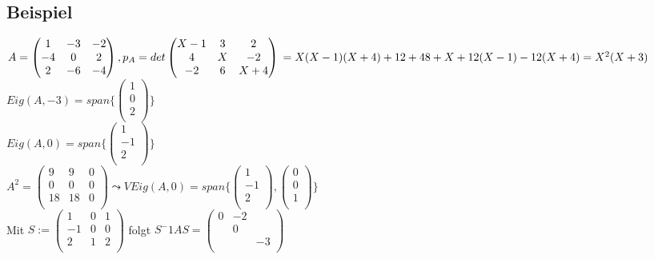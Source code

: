 \documentclass[a4paper, 12pt]{extarticle}
\begin{document}
\subsection*{Beispiel}
$A = \left( \begin{matrix}
	1 & -3 & -2\\
	-4 & 0 & 2\\
	2 & -6 & -4\\
\end{matrix} \right), 
p_A = det\left( \begin{matrix}
	X-1 & 3 & 2\\
	4 & X & -2\\
	-2 & 6 & X+4\\
\end{matrix} \right) \\
= X(X-1)(X+4) + 12 + 48 + X + 12(X-1) - 12(X+4) = X^2(X+3)$\\
$Eig(A,-3) = span\{ \left( \begin{matrix}
	1 \\
	0 \\
	2 \\
\end{matrix}\right)\}$\\
$Eig(A,0) = span\{ \left( \begin{matrix}
	1 \\
	-1 \\
	2 \\
\end{matrix}\right)\}$\\
$A^2 =\left( \begin{matrix}
	9 & 9 & 0 \\
	0 & 0 & 0 \\
	18 & 18 & 0 \\
\end{matrix}\right) \leadsto VEig(A,0) = span\{ 
\left( \begin{matrix}
1 \\
-1 \\
2 \\
\end{matrix} \right) ,
\left( \begin{matrix}
0 \\
0 \\
1 \\
\end{matrix} \right) \}$\\
Mit $S := 
\left( \begin{matrix}
	1 & 0 & 1 \\
	-1 & 0  & 0 \\
	2 & 1 & 2 \\
\end{matrix} \right)$ folgt $S^-1AS = 
\left( \begin{matrix}
	0 & -2 & \\
	& 0 \\
	 & & -3 \\
\end{matrix}\right)$ \\
\end{document}
